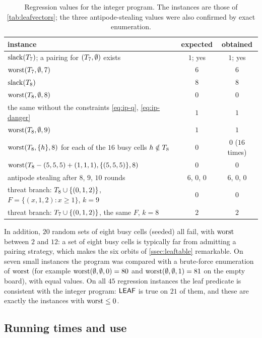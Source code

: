 \begin{table}[ht]
\centering\small
\begin{tabular}{@{}lcc@{}}
\toprule
instance & expected & obtained\\
\midrule
$\operatorname{slack}(T_7)$; a pairing for $(T_7,\emptyset)$ exists & $1$; yes & $1$; yes\\
$\operatorname{worst}(T_7,\emptyset,7)$ & $6$ & $6$\\
$\operatorname{slack}(T_8)$ & $8$ & $8$\\
$\operatorname{worst}(T_8,\emptyset,8)$ & $0$ & $0$\\
the same without the constraints \eqref{eq:ip-q}, \eqref{eq:ip-danger} & $1$ & $1$\\
$\operatorname{worst}(T_8,\emptyset,9)$ & $1$ & $1$\\
$\operatorname{worst}(T_8,\{h\},8)$ for each of the $16$ busy cells $h\notin T_8$ & $0$ & $0$ ($16$ times)\\
$\operatorname{worst}(T_8-(5,5,5)+(1,1,1),\{(5,5,5)\},8)$ & $0$ & $0$\\
antipode stealing after $8$, $9$, $10$ rounds & $6$, $0$, $0$ & $6$, $0$, $0$\\
threat branch: $T_8\cup\{(0,1,2)\}$, $F=\{(x,1,2):x\ge1\}$, $k=9$ & $0$ & $0$\\
threat branch: $T_7\cup\{(0,1,2)\}$, the same $F$, $k=8$ & $2$ & $2$\\
\bottomrule
\end{tabular}
\caption{Regression values for the integer program. The instances are those of \cref{tab:leafvectors}; the
three antipode-stealing values were also confirmed by exact enumeration.}
\label{tab:ip-regression}
\end{table}

In addition, $20$ random sets of eight busy cells (seeded) all fail, with $\operatorname{worst}$ between $2$ and $12$:
a set of eight busy cells is typically far from admitting a pairing strategy, which makes the six orbits of
\cref{ssec:leaftable} remarkable. On seven small instances the program was compared with a brute-force
enumeration of $\operatorname{worst}$ (for example $\operatorname{worst}(\emptyset,\emptyset,0)=80$ and $\operatorname{worst}(\emptyset,\emptyset,1)=81$
on the empty board), with equal values. On all $45$ regression instances the leaf predicate is consistent
with the integer program: $\mathsf{LEAF}$ is true on $21$ of them, and these are exactly the instances with
$\operatorname{worst}\le0$.

\subsection{Running times and use}\label{ssec:ip-times}

